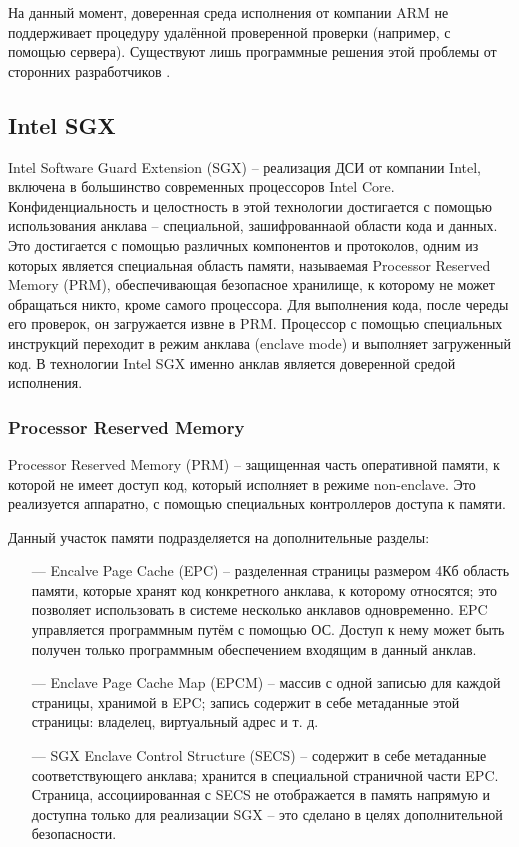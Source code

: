 На данный момент, доверенная среда исполнения от компании ARM не поддерживает процедуру удалённой проверенной проверки (например, с помощью сервера). Существуют лишь программные решения этой проблемы от сторонних разработчиков \cite{comparsion-arm-intel}.


\subsection{Intel SGX}

Intel Software Guard Extension (SGX) -- реализация ДСИ от компании Intel, включена в большинство современных процессоров Intel Core. Конфиденциальность и целостность в этой технологии достигается с помощью использования анклава -- специальной, зашифрованнаой области кода и данных. Это достигается с помощью различных компонентов и протоколов, одним из которых является специальная область памяти, называемая Processor Reserved Memory (PRM), обеспечивающая безопасное хранилище, к которому не может обращаться никто, кроме самого процессора. Для выполнения кода, после череды его проверок, он загружается извне в PRM. Процессор с помощью специальных инструкций переходит в режим анклава (enclave mode) и выполняет загруженный код. В технологии Intel SGX именно анклав является доверенной средой исполнения.

\subsubsection{Processor Reserved Memory}

Processor Reserved Memory (PRM) -- защищенная часть оперативной памяти, к которой не имеет доступ код, который исполняет в режиме non-enclave. Это реализуется аппаратно, с помощью специальных контроллеров доступа к памяти. 

Данный участок памяти подразделяется на дополнительные разделы:

\begin{itemize}
	\item [---] Encalve Page Cache (EPC) -- разделенная страницы размером 4Кб область памяти, которые хранят код конкретного анклава, к которому относятся; это позволяет использовать в системе несколько анклавов одновременно. EPC управляется программным путём с помощью ОС. Доступ к нему может быть получен только программным обеспечением входящим в данный анклав.
	\item [---] Enclave Page Cache Map (EPCM) -- массив с одной записью для каждой страницы, хранимой в EPC; запись содержит в себе метаданные этой страницы: владелец, виртуальный адрес и т. д.
	\item [---] SGX Enclave Control Structure (SECS) -- содержит в себе метаданные соответствующего анклава; хранится в специальной страничной части EPC. Страница, ассоциированная с SECS не отображается в память напрямую и доступна только для реализации SGX -- это сделано в целях дополнительной безопасности.
\end{itemize}

